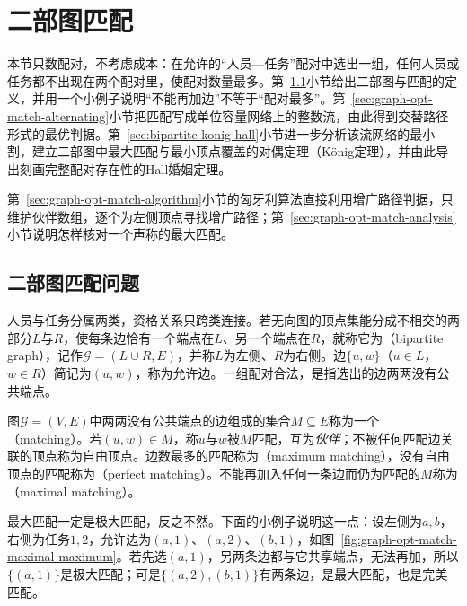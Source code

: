 
\section{二部图匹配}
\label{sec:graph-matching}

本节只数配对，不考虑成本：在允许的“人员—任务”配对中选出一组，任何人员或任务都不出现在两个配对里，使配对数量最多。第~\ref{sec:graph-opt-match-problem}小节给出二部图与匹配的定义，并用一个小例子说明“不能再加边”不等于“配对最多”。第~\ref{sec:graph-opt-match-alternating}小节把匹配写成单位容量网络上的整数流，由此得到交替路径形式的最优判据。第~\ref{sec:bipartite-konig-hall}小节进一步分析该流网络的最小割，建立二部图中最大匹配与最小顶点覆盖的对偶定理（König定理），并由此导出刻画完整配对存在性的Hall婚姻定理。

第~\ref{sec:graph-opt-match-algorithm}小节的匈牙利算法直接利用增广路径判据，只维护伙伴数组，逐个为左侧顶点寻找增广路径；第~\ref{sec:graph-opt-match-analysis}小节说明怎样核对一个声称的最大匹配。

\subsection{二部图匹配问题}
\label{sec:graph-opt-match-problem}

人员与任务分属两类，资格关系只跨类连接。若无向图的顶点集能分成不相交的两部分$L$与$R$，使每条边恰有一个端点在$L$、另一个端点在$R$，就称它为（bipartite graph），记作$\mathcal G=(L\cup R,E)$，并称$L$为左侧、$R$为右侧。边$\{u,w\}$（$u\in L$，$w\in R$）简记为$(u,w)$，称为允许边。一组配对合法，是指选出的边两两没有公共端点。

\begin{definition}[匹配]
\label{def:graph-opt-matching}
图$\mathcal G=(V,E)$中两两没有公共端点的边组成的集合$M\subseteq E$称为一个（matching）。若$(u,w)\in M$，称$u$与$w$被$M$匹配，互为\emph{伙伴}；不被任何匹配边关联的顶点称为自由顶点。边数最多的匹配称为（maximum matching），没有自由顶点的匹配称为（perfect matching）。不能再加入任何一条边而仍为匹配的$M$称为（maximal matching）。
\end{definition}

最大匹配一定是极大匹配，反之不然。下面的小例子说明这一点：设左侧为$a,b$，右侧为任务$1,2$，允许边为$(a,1)$、$(a,2)$、$(b,1)$，如图~\ref{fig:graph-opt-match-maximal-maximum}。若先选$(a,1)$，另两条边都与它共享端点，无法再加，所以$\{(a,1)\}$是极大匹配；可是$\{(a,2),(b,1)\}$有两条边，是最大匹配，也是完美匹配。

